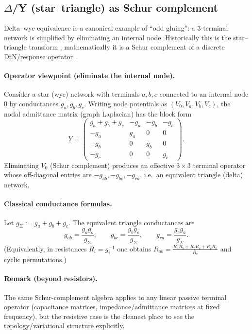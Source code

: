 \documentclass[11pt]{article}
\begin{document}
\subsection{\texorpdfstring{$\Delta$/Y (star--triangle) as Schur complement}{Delta/Y (star--triangle) as Schur complement}}
\label{sec:delta-wye}
Delta--wye equivalence is a canonical example of ``odd gluing'': a $3$-terminal network is simplified by eliminating an internal node.
Historically this is the star--triangle transform \cite{kennelly_1899}; mathematically it is a Schur complement of a discrete DtN/response operator \cite{curtis_ingerman_morrow_1998}.

\paragraph{Operator viewpoint (eliminate the internal node).}
Consider a star (wye) network with terminals $a,b,c$ connected to an internal node $0$ by conductances $g_a,g_b,g_c$.
Writing node potentials as $(V_0,V_a,V_b,V_c)$, the nodal admittance matrix (graph Laplacian) has the block form
\[
Y=\begin{pmatrix}
g_a+g_b+g_c & -g_a & -g_b & -g_c\\
-g_a & g_a & 0 & 0\\
-g_b & 0 & g_b & 0\\
-g_c & 0 & 0 & g_c
\end{pmatrix}.
\]
Eliminating $V_0$ (Schur complement) produces an effective $3\times 3$ terminal operator whose off-diagonal entries are $-g_{ab},-g_{bc},-g_{ca}$, i.e.\ an equivalent triangle (delta) network.

\paragraph{Classical conductance formulas.}
Let $g_\Sigma:=g_a+g_b+g_c$.
The equivalent triangle conductances are
\[
g_{ab}=\frac{g_ag_b}{g_\Sigma},\qquad
g_{bc}=\frac{g_bg_c}{g_\Sigma},\qquad
g_{ca}=\frac{g_cg_a}{g_\Sigma}.
\]
(Equivalently, in resistances $R_i=g_i^{-1}$ one obtains $R_{ab}=\frac{R_aR_b+R_bR_c+R_cR_a}{R_c}$ and cyclic permutations.)

\paragraph{Remark (beyond resistors).}
The same Schur-complement algebra applies to any linear passive terminal operator (capacitance matrices, impedance/admittance matrices at fixed frequency), but the resistive case is the cleanest place to see the topology/variational structure explicitly.
\end{document}

